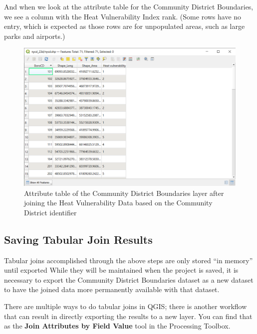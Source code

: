 \documentclass[
  letterpaper,
  DIV=11,
  numbers=noendperiod]{scrreprt}
\begin{document}
And when we look at the attribute table for the Community District
Boundaries, we see a column with the Heat Vulnerability Index rank.
(Some rows have no entry, which is expected as those rows are for
unpopulated areas, such as large parks and airports.)

\begin{figure}

{\centering \includegraphics{./images/HVI_CD_Join_Result.png}

}

\caption{Attribute table of the Community District Boundaries layer
after joining the Heat Vulnerability Data based on the Community
District identifier}

\end{figure}

\hypertarget{saving-tabular-join-results}{%
\subsection{Saving Tabular Join
Results}\label{saving-tabular-join-results}}

Tabular joins accomplished through the above steps are only stored ``in
memory'' until exported While they will be maintained when the project
is saved, it is necessary to export the Community District Boundaries
dataset as a new dataset to have the joined data more permanently
available with that dataset.

There are multiple ways to do tabular joins in QGIS; there is another
workflow that can result in directly exporting the results to a new
layer. You can find that as the \textbf{Join Attributes by Field Value}
tool in the Processing Toolbox.
\end{document}
